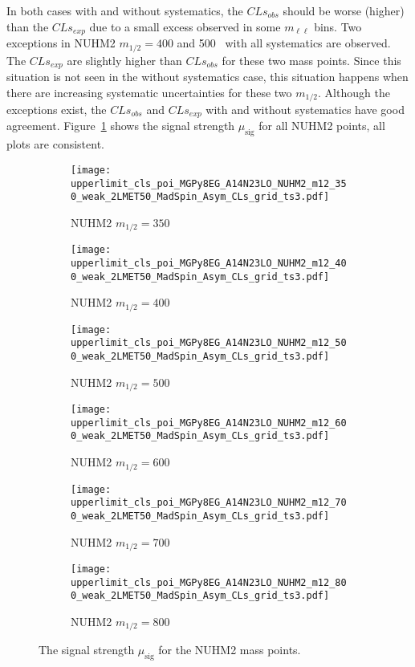 In both cases with and without systematics, the $CLs_{obs}$ should be worse (higher) than the $CLs_{exp}$ due to a small excess observed in some $m_{\ell \ell}$ bins.
Two exceptions in NUHM2 $m_{1/2} = 400$ and 500~{\GeV} with all systematics are observed.
The $CLs_{exp}$ are slightly higher than $CLs_{obs}$ for these two mass points.
Since this situation is not seen in the without systematics case, this situation happens when there are increasing systematic uncertainties for these two $m_{1/2}$.
Although the exceptions exist, the $CLs_{obs}$ and $CLs_{exp}$ with and without systematics have good agreement.
Figure~\ref{fig:results_nuhm2_signal_strength} shows the signal strength $\mu_\mathrm{sig}$ for all NUHM2 points, all plots are consistent.

\begin{figure}[htbp]
    \begin{center}
        \begin{subfigure}[b]{0.48\textwidth}
            \texttt{[image: upperlimit\_cls\_poi\_MGPy8EG\_A14N23LO\_NUHM2\_m12\_350\_weak\_2LMET50\_MadSpin\_Asym\_CLs\_grid\_ts3.pdf]}
            \caption{NUHM2 $m_{1/2} = 350$~{\GeV}}
        \end{subfigure}
        \begin{subfigure}[b]{0.48\textwidth}
            \texttt{[image: upperlimit\_cls\_poi\_MGPy8EG\_A14N23LO\_NUHM2\_m12\_400\_weak\_2LMET50\_MadSpin\_Asym\_CLs\_grid\_ts3.pdf]}
            \caption{NUHM2 $m_{1/2} = 400$~{\GeV}}
        \end{subfigure}
        \begin{subfigure}[b]{0.48\textwidth}
            \texttt{[image: upperlimit\_cls\_poi\_MGPy8EG\_A14N23LO\_NUHM2\_m12\_500\_weak\_2LMET50\_MadSpin\_Asym\_CLs\_grid\_ts3.pdf]}
            \caption{NUHM2 $m_{1/2} = 500$~{\GeV}}
        \end{subfigure}
        \begin{subfigure}[b]{0.48\textwidth}
            \texttt{[image: upperlimit\_cls\_poi\_MGPy8EG\_A14N23LO\_NUHM2\_m12\_600\_weak\_2LMET50\_MadSpin\_Asym\_CLs\_grid\_ts3.pdf]}
            \caption{NUHM2 $m_{1/2} = 600$~{\GeV}}
        \end{subfigure}
        \begin{subfigure}[b]{0.48\textwidth}
            \texttt{[image: upperlimit\_cls\_poi\_MGPy8EG\_A14N23LO\_NUHM2\_m12\_700\_weak\_2LMET50\_MadSpin\_Asym\_CLs\_grid\_ts3.pdf]}
            \caption{NUHM2 $m_{1/2} = 700$~{\GeV}}
        \end{subfigure}
        \begin{subfigure}[b]{0.48\textwidth}
            \texttt{[image: upperlimit\_cls\_poi\_MGPy8EG\_A14N23LO\_NUHM2\_m12\_800\_weak\_2LMET50\_MadSpin\_Asym\_CLs\_grid\_ts3.pdf]}
            \caption{NUHM2 $m_{1/2} = 800$~{\GeV}}
        \end{subfigure}
    \end{center}
    \caption{The signal strength $\mu_\mathrm{sig}$ for the NUHM2 mass points.}
    \label{fig:results_nuhm2_signal_strength}
\end{figure}

